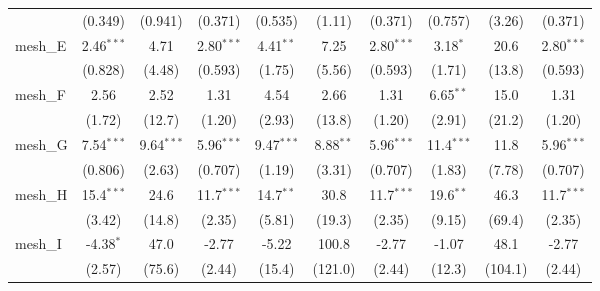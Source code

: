 \begin{tabular}{lccccccccc}
                                                               & (0.349)       & (0.941)       & (0.371)       & (0.535)        & (1.11)         & (0.371)       & (0.757)       & (3.26)        & (0.371)\\   
   mesh\_E                                                     & 2.46$^{***}$  & 4.71          & 2.80$^{***}$  & 4.41$^{**}$    & 7.25           & 2.80$^{***}$  & 3.18$^{*}$    & 20.6          & 2.80$^{***}$\\   
                                                               & (0.828)       & (4.48)        & (0.593)       & (1.75)         & (5.56)         & (0.593)       & (1.71)        & (13.8)        & (0.593)\\   
   mesh\_F                                                     & 2.56          & 2.52          & 1.31          & 4.54           & 2.66           & 1.31          & 6.65$^{**}$   & 15.0          & 1.31\\   
                                                               & (1.72)        & (12.7)        & (1.20)        & (2.93)         & (13.8)         & (1.20)        & (2.91)        & (21.2)        & (1.20)\\   
   mesh\_G                                                     & 7.54$^{***}$  & 9.64$^{***}$  & 5.96$^{***}$  & 9.47$^{***}$   & 8.88$^{**}$    & 5.96$^{***}$  & 11.4$^{***}$  & 11.8          & 5.96$^{***}$\\   
                                                               & (0.806)       & (2.63)        & (0.707)       & (1.19)         & (3.31)         & (0.707)       & (1.83)        & (7.78)        & (0.707)\\   
   mesh\_H                                                     & 15.4$^{***}$  & 24.6          & 11.7$^{***}$  & 14.7$^{**}$    & 30.8           & 11.7$^{***}$  & 19.6$^{**}$   & 46.3          & 11.7$^{***}$\\   
                                                               & (3.42)        & (14.8)        & (2.35)        & (5.81)         & (19.3)         & (2.35)        & (9.15)        & (69.4)        & (2.35)\\   
   mesh\_I                                                     & -4.38$^{*}$   & 47.0          & -2.77         & -5.22          & 100.8          & -2.77         & -1.07         & 48.1          & -2.77\\   
                                                               & (2.57)        & (75.6)        & (2.44)        & (15.4)         & (121.0)        & (2.44)        & (12.3)        & (104.1)       & (2.44)\\   

\end{tabular}
